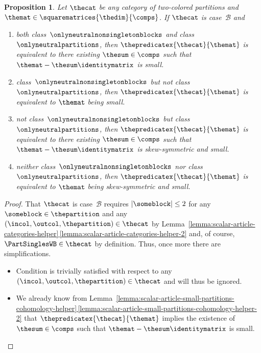 \documentclass[pdftex]{sigma}
\numberwithin{equation}{section}
\newtheorem{Proposition}[Theorem]{Proposition}
{ \theoremstyle{definition}
\newtheorem{Definition}[Theorem]{Definition}
\newtheorem{Note}[Theorem]{Note}
\newtheorem{Example}[Theorem]{Example}
\newtheorem{Remark}[Theorem]{Remark}
\newtheorem{Notation}[Theorem]{Notation}
\newtheorem{Assumptions}[Theorem]{Assumptions}
}
\begin{document}
{\begin{Proposition}
  \label{proposition:final-case-b}
  Let $\thecat$ be any category of two-colored partitions and $\themat\in\squarematrices{\thedim}{\comps}$.
  If $\thecat$ is case~$\mathcal{B}$ and
    \begin{enumerate}[label=$(\roman*)$]
    \item\label{proposition:final-case-b-1}  both  class~$\onlyneutralnonsingletonblocks$ and class~$\onlyneutralpartitions$, then $\thepredicatex{\thecat}{\themat}$ is equivalent to there existing $\thesum\in\comps$ such that $\themat-\thesum\identitymatrix$ is small.
    \item\label{proposition:final-case-b-2}  class~$\onlyneutralnonsingletonblocks$ but not class~$\onlyneutralpartitions$, then $\thepredicatex{\thecat}{\themat}$ is equivalent to  $\themat$ being small.
    \item\label{proposition:final-case-b-3}  not class~$\onlyneutralnonsingletonblocks$ but  class~$\onlyneutralpartitions$, then $\thepredicatex{\thecat}{\themat}$ is equivalent to there existing $\thesum\in\comps$ such that $\themat-\thesum\identitymatrix$ is skew-symmetric and small.
    \item\label{proposition:final-case-b-4}  neither class~$\onlyneutralnonsingletonblocks$ nor class~$\onlyneutralpartitions$, then $\thepredicatex{\thecat}{\themat}$ is equivalent to $\themat$ being skew-symmetric and small.
  \end{enumerate}
\end{Proposition}
\begin{proof}
  That $\thecat$ is case~$\mathcal{B}$ requires  $|\someblock|\leq 2$ for any $\someblock\in\thepartition$ and any $(\incol,\outcol,\thepartition)\in\thecat$ by Lem\-ma~\hyperref[lemma:scalar-article-categories-helper-2]{\ref*{lemma:scalar-article-categories-helper}\,\ref*{lemma:scalar-article-categories-helper-2}} and, of course,  $\PartSinglesWB\in \thecat$ by definition. Thus, once more there are simplifications.
  \begin{itemize}
    \item Condition \conditionthree{} is trivially satisfied with respect to any $(\incol,\outcol,\thepartition)\in\thecat$ and will thus be ignored.
      \item  We already know from Lem\-ma~\hyperref[lemma:scalar-article-small-partitions-cohomology-helper-2]{\ref*{lemma:scalar-article-small-partitions-cohomology-helper}\,\ref*{lemma:scalar-article-small-partitions-cohomology-helper-2}} that  $\thepredicatex{\thecat}{\themat}$ implies the existence of $\thesum\in\comps$ such that $\themat-\thesum\identitymatrix$ is small.
  \end{itemize}


\end{proof}}
\end{document}
